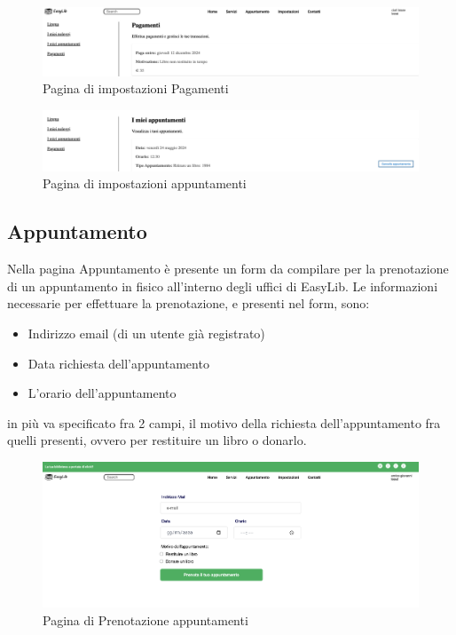 \documentclass{article}
\begin{document}
\begin{figure}[H]
    \centering
    \includegraphics[width=130mm]{D4/Images/pagamenti.png}
    \caption{Pagina di impostazioni Pagamenti}
\end{figure}

\begin{figure}[H]
    \centering
    \includegraphics[width=130mm]{D4/Images/appuntamenti.png}
    \caption{Pagina di impostazioni appuntamenti}
\end{figure}

\subsection{Appuntamento}
Nella pagina Appuntamento è presente un form da compilare per la prenotazione di un appuntamento in fisico all'interno degli uffici di EasyLib. Le informazioni necessarie per effettuare la prenotazione, e presenti nel form, sono:
\begin{itemize}
    \item Indirizzo email (di un utente già registrato)
    \item Data richiesta dell'appuntamento
    \item L'orario dell'appuntamento
\end{itemize}
in più va specificato fra 2 campi, il motivo della richiesta dell'appuntamento fra quelli presenti, ovvero per restituire un libro  o donarlo.
\begin{figure}[H]
    \centering
    \includegraphics[width=130mm]{D4/Images/Appuntamento.png}
    \caption{Pagina di Prenotazione appuntamenti}
\end{figure}
\end{document}
